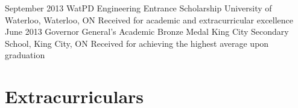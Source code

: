 \documentclass[hidelinks]{kkurucz-cv}
\begin{document}
\begin{entrylist}
\entry
{September 2013}
{WatPD Engineering Entrance Scholarship}
{University of Waterloo, Waterloo, ON}
{Received for academic and extracurricular excellence}
{\null}
\entry
{June 2013}
{Governor General's Academic Bronze Medal}
{King City Secondary School, King City, ON}
{Received for achieving the highest average upon graduation}
{\null}
\end{entrylist}


\section{Extracurriculars}
\end{document}
